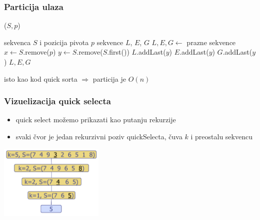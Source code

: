 \documentclass[compress]{beamer}
\begin{document}
\begin{frame}
  \frametitle{Particija ulaza}
  ($S, p$)
  \begin{algorithmic}
    \REQUIRE sekvenca $S$ i pozicija pivota $p$
    \ENSURE sekvence $L$, $E$, $G$
    \STATE $L,E,G \leftarrow$ prazne sekvence
    \STATE $x \leftarrow S$.remove($p$) 
      \STATE $y \leftarrow S$.remove($S$.first())
        \STATE $L$.addLast($y$)
        \STATE $E$.addLast($y$)
      \ELSE 
        \STATE $G$.addLast($y$)
      \ENDIF
    \ENDWHILE
    \RETURN $L,E,G$
  \end{algorithmic}
  \hfill isto kao kod quick sorta $\Rightarrow$ particija je $O(n)$    
\end{frame}

\begin{frame}[fragile]
  \frametitle{Vizuelizacija quick selecta}
  \begin{itemize}
    \item quick select možemo prikazati kao putanju rekurzije
    \item svaki čvor je jedan rekurzivni poziv quickSelecta, čuva $k$ i preostalu sekvencu
  \end{itemize}
  \begin{center}
    \includegraphics[width=5cm]{asp-12-pic37.png}
  \end{center}
\end{frame}
\end{document}
